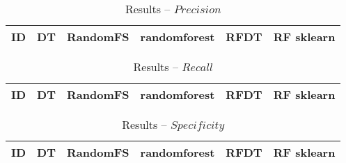 \documentclass{llncs}
\begin{document}
\begin{table}[!ht]
\centering
\caption{Results -- $Precision$}
\begin{tabular}{r c c c c c}
  \hline
\textbf{ID} & \textbf{DT} & \textbf{RandomFS} & \textbf{randomforest} & \textbf{RFDT} & \textbf{RF sklearn}\\
    \hline
    
\end{tabular}
\end{table}

\begin{table}[!ht]
\centering
\caption{Results -- $Recall$}
\begin{tabular}{r c c c c c}
  \hline
\textbf{ID} & \textbf{DT} & \textbf{RandomFS} & \textbf{randomforest} & \textbf{RFDT} & \textbf{RF sklearn}\\
    \hline
    
\end{tabular}
\end{table}

\begin{table}[!ht]
\centering
\caption{Results -- $Specificity$}
\begin{tabular}{r c c c c c}
  \hline
\textbf{ID} & \textbf{DT} & \textbf{RandomFS} & \textbf{randomforest} & \textbf{RFDT} & \textbf{RF sklearn}\\
    \hline
    
\end{tabular}
\end{table}
\end{document}
